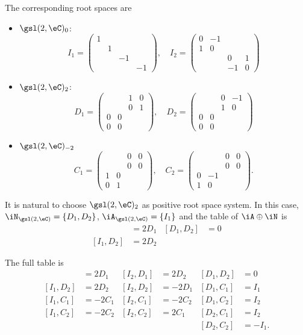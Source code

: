 The corresponding root spaces are
\begin{itemize}
\item $\gsl(2,\eC)_0$:
\[
  I_1=
\begin{pmatrix}
1\\&1\\&&-1\\&&&-1
\end{pmatrix},\quad
I_2=
\begin{pmatrix}
0&-1\\
1&0\\
&&0&1\\
&&-1&0
\end{pmatrix}
\]
\item $\gsl(2,\eC)_2$:
\[
  D_1=\begin{pmatrix}
&&1&0\\
&&0&1\\
0&0\\
0&0
\end{pmatrix},\quad
D_2=
\begin{pmatrix}
&&0&-1\\
&&1&0\\
0&0&\\
0&0&
\end{pmatrix}
\]
\item $\gsl(2,\eC)_{-2}$
\[
  C_1=\begin{pmatrix}
&&0&0\\
&&0&0\\
1&0\\
0&1
\end{pmatrix},\quad
C_2=\begin{pmatrix}
&&0&0\\
&&0&0\\
0&-1\\
1&0
\end{pmatrix}.
\]
\end{itemize}
It is natural to choose $\gsl(2,\eC)_2$ as positive root space system. In this case, $\iN_{\gsl(2,\eC)}=\{ D_1,D_2 \}$, $\iA_{\gsl(2,\eC)}=\{ I_1 \}$ and the table of $\iA\oplus\iN$ is
\begin{align}
[I_1,D_1]&=2D_1&		[D_1,D_2]&=0\\
[I_1,D_2]&=2D_2&
\end{align}

    The full table is
\begin{align}
[I_1,D_1]&=2D_1&	[I_2,D_1]&=2D_2&	[D_1,D_2]&=0\\
[I_1,D_2]&=2D_2&	[I_2,D_2]&=-2D_1&	[D_1,C_1]&=I_1\\
[I_1,C_1]&=-2C_1&	[I_2,C_1]&=-2C_2&	[D_1,C_2]&=I_2\\
[I_1,C_2]&=-2C_2&	[I_2,C_2]&=2C_1&	[D_2,C_1]&=I_2\\
	&	&		&     &		[D_2,C_2]&=-I_1.
\end{align}
